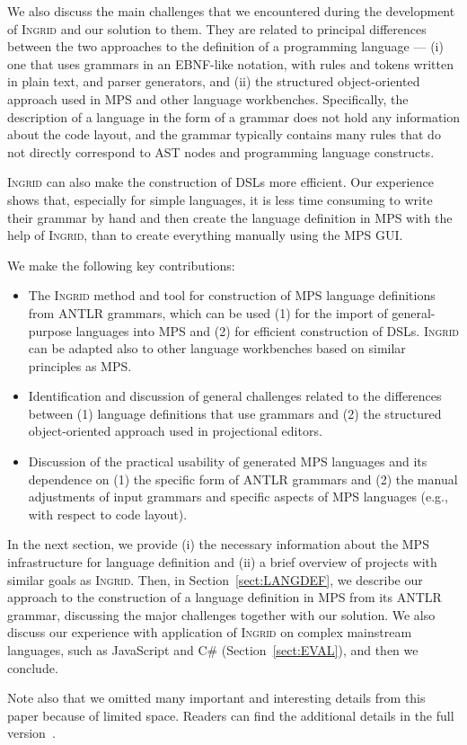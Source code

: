 We also discuss the main challenges that we encountered during the development of \textsc{Ingrid} and our solution to them.
They are related to principal differences between the two approaches to the definition of a programming language --- (i) one that uses grammars in an EBNF-like notation, with rules and tokens written in plain text, and parser generators, and (ii) the structured object-oriented approach used in MPS and other language workbenches.
Specifically, the description of a language in the form of a grammar does not hold any information about the code layout, and the grammar typically contains many rules that do not directly correspond to AST nodes and programming language constructs.

\textsc{Ingrid} can also make the construction of DSLs more efficient.
Our experience shows that, especially for simple languages, it is less time consuming to write their grammar by hand and then create the language definition in MPS with the help of \textsc{Ingrid}, than to create everything manually using the MPS GUI.

We make the following key contributions:
\begin{itemize}
	\item The \textsc{Ingrid} method and tool for construction of MPS language definitions from ANTLR grammars, which can be used (1) for the import of general-purpose languages into MPS and (2) for efficient construction of DSLs. \textsc{Ingrid} can be adapted also to other language workbenches based on similar principles as MPS.
	\item Identification and discussion of general challenges related to the differences between (1) language definitions that use grammars and (2) the structured object-oriented approach used in projectional editors.
	\item Discussion of the practical usability of generated MPS languages and its dependence on (1) the specific form of ANTLR grammars and (2) the manual adjustments of input grammars and specific aspects of MPS languages (e.g., with respect to code layout).
\end{itemize}

In the next section, we provide (i) the necessary information about the MPS infrastructure for language definition and (ii) a brief overview of projects with similar goals as \textsc{Ingrid}.
Then, in Section~\ref{sect:LANGDEF}, we describe our approach to the construction of a language definition in MPS from its ANTLR grammar, discussing the major challenges together with our solution.
We also discuss our experience with application of \textsc{Ingrid} on complex mainstream languages, such as JavaScript and C\# (Section~\ref{sect:EVAL}), and then we conclude.

Note also that we omitted many important and interesting details from this paper because of limited space.
Readers can find the additional details in the full version~\cite{ref:TRFULL}.


